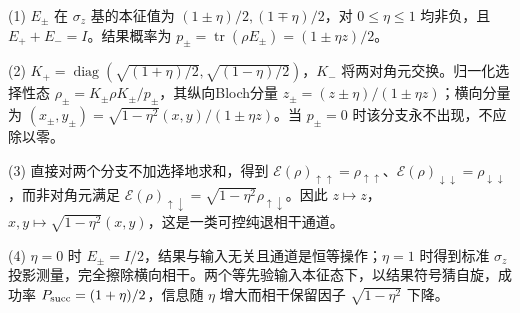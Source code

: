 (1) \(E_\pm\) 在 \(\sigma_z\) 基的本征值为 \((1\pm\eta)/2,(1\mp\eta)/2\)，对 \(0\le\eta\le1\) 均非负，且 \(E_++E_-=I\)。结果概率为 \(p_\pm=\operatorname{tr}(\rho E_\pm)=(1\pm\eta z)/2\)。

(2) \(K_+=\operatorname{diag}(\sqrt{(1+\eta)/2},\sqrt{(1-\eta)/2})\)，\(K_-\) 将两对角元交换。归一化选择性态 \(\rho_\pm=K_\pm\rho K_\pm/p_\pm\)，其纵向Bloch分量 \(z_\pm=(z\pm\eta)/(1\pm\eta z)\)；横向分量为 \((x_\pm,y_\pm)=\sqrt{1-\eta^2}(x,y)/(1\pm\eta z)\)。当 \(p_\pm=0\) 时该分支永不出现，不应除以零。

(3) 直接对两个分支不加选择地求和，得到 \(\mathcal E(\rho)_{\uparrow\uparrow}=\rho_{\uparrow\uparrow}\)、\(\mathcal E(\rho)_{\downarrow\downarrow}=\rho_{\downarrow\downarrow}\)，而非对角元满足 \(\mathcal E(\rho)_{\uparrow\downarrow}=\sqrt{1-\eta^2}\rho_{\uparrow\downarrow}\)。因此 \(z\mapsto z\)，\(x,y\mapsto\sqrt{1-\eta^2}(x,y)\)，这是一类可控纯退相干通道。

(4) \(\eta=0\) 时 \(E_\pm=I/2\)，结果与输入无关且通道是恒等操作；\(\eta=1\) 时得到标准 \(\sigma_z\) 投影测量，完全擦除横向相干。两个等先验输入本征态下，以结果符号猜自旋，成功率 \(P_{\rm succ}=(1+\eta)/2\)，信息随 \(\eta\) 增大而相干保留因子 \(\sqrt{1-\eta^2}\) 下降。
